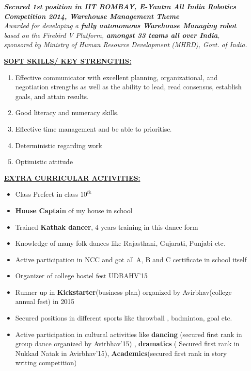 \documentclass{article}
\begin{document}
				\begin{center}
					\emph{\textbf{Secured 1st position in IIT BOMBAY, E-Yantra All India Robotics Competition 2014, Warehouse Management Theme}\\
						Awarded for developing a \textbf{fully autonomous Warehouse Managing robot} based on the Firebird V Platform, \textbf{amongst 33 teams all over India}, sponsored by Ministry of Human Resource Development (MHRD), Govt. of India.}
					\\[\baselineskip]
				\end{center}
				\underline{\textbf{SOFT SKILLS/ KEY STRENGTHS:}}\\
				\begin{enumerate}
					\item Effective communicator with excellent planning, organizational, and negotiation strengths as well as the ability to lead, read consensus, establish goals, and attain results.
					\item Good literacy and numeracy skills.
					\item Effective time management and be able to prioritise.
					\item Deterministic regarding work
					\item Optimistic attitude
					\\[\baselineskip]
				\end{enumerate}
				\underline{\textbf{EXTRA CURRICULAR ACTIVITIES:}}\\
				\begin{itemize}
					\item Class Prefect in class $10^{th}$
					\item \textbf{House Captain} of my house in school
					\item Trained \textbf{Kathak dancer}, 4 years training in this dance form
					\item Knowledge of many folk dances like Rajasthani, Gujarati, Punjabi etc.
					\item Active participation in NCC and got all A, B and C certificate in school itself
					\item Organizer of college hostel fest UDBAHV'15
					\item Runner up in \textbf{Kickstarter}(business plan) organized by Avirbhav(college annual fest) in 2015 
					\item Secured positions in different sports like throwball , badminton, goal etc.
					\item Active participation in cultural activities like \textbf{dancing} (secured first rank in group dance organized by Avirbhav'15) , \textbf{dramatics} ( Secured first rank in Nukkad Natak in Avirbhav'15), \textbf{Academics}(secured first rank in story writing competition)
					\\[\baselineskip]
				\end{itemize}
			
\end{document}

